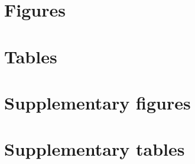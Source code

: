 \documentclass[aoas]{imsart}
\newcommand{\beginsupplement}{%
        \setcounter{table}{0}
        \renewcommand{\thetable}{S\arabic{table}}%
        \setcounter{figure}{0}
        \renewcommand{\thefigure}{S\arabic{figure}}%
     }
\begin{document}


\section{Figures}
\newpage

\newpage

\section{Tables}
\newpage

\newpage

\section{Supplementary figures}
\beginsupplement
\newpage

\newpage

\section{Supplementary tables}
\newpage

\newpage
\end{document}
